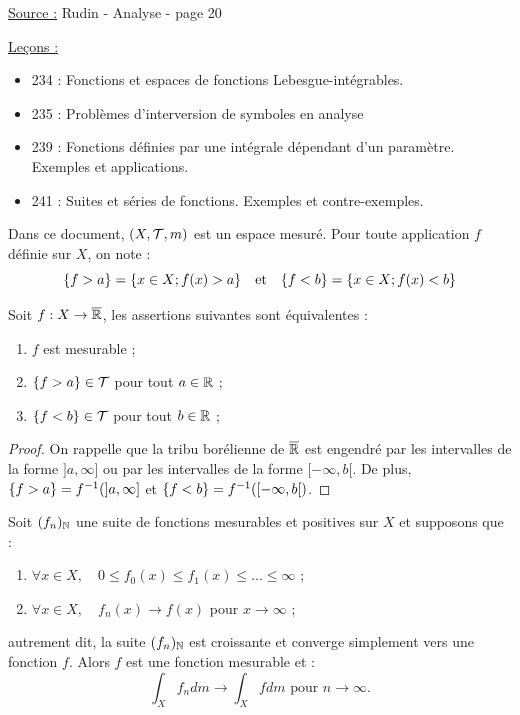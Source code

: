 

\pagestyle{fancy}

\fancyhead[R]{}



\underline{Source :} Rudin - Analyse - page 20 \newline

\underline{Leçons :} 
\begin{itemize}
\item 234 : Fonctions et espaces de fonctions Lebesgue-intégrables.
\item 235 : Problèmes d’interversion de symboles en analyse
\item 239 : Fonctions définies par une intégrale dépendant d’un paramètre. Exemples et applications.
\item 241 : Suites et séries de fonctions. Exemples et contre-exemples.
\end{itemize}

\begin{nota}
Dans ce document, $(X, \mathcal{T}, m)$ est un espace mesuré.
Pour toute application $f$ définie sur $X$, on note :
\[ \{ f > a \} = \{ x \in X ; f(x) > a \} \quad \text{et} \quad \{ f< b \} = \{ x \in X ; f(x) < b \} \]
\end{nota}

\begin{lem}
Soit $f : X \to \overline{\mathbb{R}}$, les assertions suivantes sont équivalentes :
\begin{enumerate}[label=(\roman*)]
\item $f$ est mesurable ;
\item $\{ f > a \} \in \mathcal{T}$ pour tout $a \in \mathbb{R}$ ;
\item $\{ f < b \} \in \mathcal{T}$ pour tout $b \in \mathbb{R}$ ;
\end{enumerate}
\end{lem}

\begin{proof}
On rappelle que la tribu borélienne de $\overline{\mathbb{R}}$ est engendré par les intervalles de la forme $]a, \infty]$ ou par les intervalles de la forme
$[-\infty, b[$. De plus, $\{ f > a \} = f^{-1}(]a, \infty]$ et $\{ f < b \} = f^{-1}([-\infty, b[)$.
\end{proof}

\begin{thm}
Soit $(f_n)_{\mathbb{N}}$ une suite de fonctions mesurables et positives sur $X$ et supposons que :
\begin{enumerate}[label=(\roman*)]
\item $\forall x \in X, \quad 0 \leq f_0(x) \leq f_1(x) \leq \dots \leq \infty$ ;
\item $\forall x \in X, \quad f_n(x) \to f(x)$ pour $x \to \infty$ ;
\end{enumerate}
autrement dit, la suite $(f_n)_{\mathbb{N}}$ est croissante et converge simplement vers une fonction $f$.
Alors $f$ est une fonction mesurable et :
\[ \int_X f_n dm \to \int_X f dm \text{ pour } n \to \infty . \]
\end{thm}

